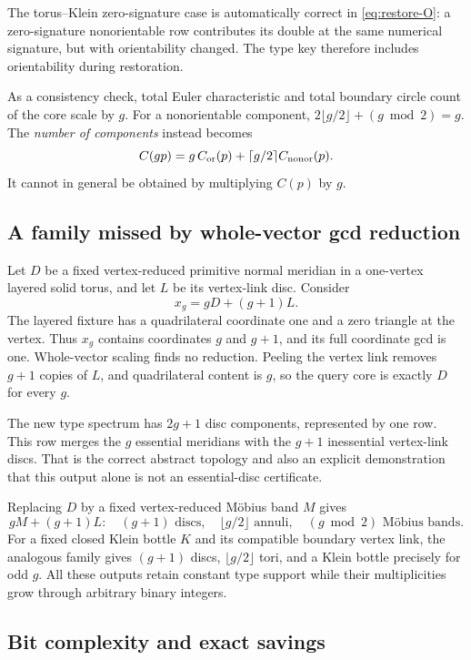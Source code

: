 The torus--Klein zero-signature case is automatically correct in
\eqref{eq:restore-O}: a zero-signature nonorientable row contributes its
double at the same numerical signature, but with orientability changed.
The type key therefore includes orientability during restoration.

As a consistency check, total Euler characteristic and total boundary
circle count of the core scale by $g$. For a nonorientable component,
$2\lfloor g/2\rfloor+(g\bmod2)=g$. The \emph{number of components}
instead becomes
\[
 C(gp)=g\,C_{\rm or}(p)+\lceil g/2\rceil C_{\rm nonor}(p).
\]
It cannot in general be obtained by multiplying $C(p)$ by $g$.

\subsection{A family missed by whole-vector gcd reduction}

Let $D$ be a fixed vertex-reduced primitive normal meridian in a one-vertex
layered solid torus, and let $L$ be its vertex-link disc. Consider
\begin{equation}
 x_g=gD+(g+1)L.\label{eq:disc-family}
\end{equation}
The layered fixture has a quadrilateral coordinate one and a zero triangle
at the vertex. Thus $x_g$ contains coordinates $g$ and $g+1$, and its full
coordinate gcd is one. Whole-vector scaling finds no reduction. Peeling
the vertex link removes $g+1$ copies of $L$, and quadrilateral content is
$g$, so the query core is exactly $D$ for every $g$.

The new type spectrum has $2g+1$ disc components, represented by one row.
This row merges the $g$ essential meridians with the $g+1$ inessential
vertex-link discs. That is the correct abstract topology and also an
explicit demonstration that this output alone is not an essential-disc
certificate.

Replacing $D$ by a fixed vertex-reduced M\"obius band $M$ gives
\[
 gM+(g+1)L:
 \quad (g+1)\text{ discs},\quad
 \lfloor g/2\rfloor\text{ annuli},\quad
 (g\bmod2)\text{ M\"obius bands}.
\]
For a fixed closed Klein bottle $K$ and its compatible boundary vertex link,
the analogous family gives $(g+1)$ discs,
$\lfloor g/2\rfloor$ tori, and a Klein bottle precisely for odd $g$.
All these outputs retain constant type support while their multiplicities
grow through arbitrary binary integers.

\subsection{Bit complexity and exact savings}

